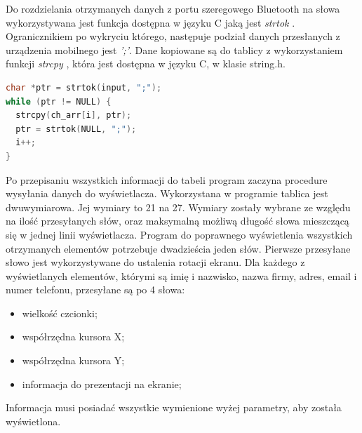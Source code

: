 \documentclass[a4paper,12pt, twoside]{article}
\begin{document}
    	Do rozdzielania otrzymanych danych z portu szeregowego Bluetooth na słowa wykorzystywana jest funkcja dostępna w języku C jaką jest \textit{strtok} \cite{strtok}. \label{petladekod}Ogranicznikiem po wykryciu którego, następuje podział danych przesłanych z urządzenia mobilnego jest \textit{';'}. Dane kopiowane są do tablicy z wykorzystaniem funkcji \textit{strcpy} \cite{strcpy}, która jest dostępna w języku C, w klasie string.h. 
    \begin{lstlisting}[language=C++, label={lst:petlaprzepisujaca}, caption=Działanie pętli przepisującej otrzymane dane do tablicy]
char *ptr = strtok(input, ";");
while (ptr != NULL) {
  strcpy(ch_arr[i], ptr);
  ptr = strtok(NULL, ";");
  i++;
}\end{lstlisting}
    
        Po przepisaniu wszystkich informacji do tabeli program zaczyna procedure wysyłania danych do wyświetlacza. Wykorzystana w programie tablica jest dwuwymiarowa. Jej wymiary to 21 na 27. Wymiary zostały wybrane ze względu na ilość przesyłanych słów,  oraz maksymalną możliwą długość słowa mieszczącą się w jednej linii wyświetlacza. Program do poprawnego wyświetlenia wszystkich otrzymanych elementów potrzebuje dwadzieścia jeden słów. Pierwsze przesyłane słowo jest wykorzystywane do ustalenia rotacji ekranu. Dla każdego z wyświetlanych elementów, którymi są imię i nazwisko, nazwa firmy, adres, email i numer telefonu, przesyłane są po 4 słowa:
        \begin{itemize}
            \item wielkość czcionki;
            \item współrzędna kursora X;
            \item współrzędna kursora Y;
            \item informacja do prezentacji na ekranie;
        \end{itemize}
    
    	Informacja musi posiadać wszystkie wymienione wyżej parametry, aby została wyświetlona.
    	
\end{document}
